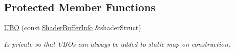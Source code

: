 \subsection*{Protected Member Functions}
\begin{DoxyCompactItemize}
\item 
\mbox{\label{classrev_1_1_u_b_o_a256028e880cb64f45ed9f4bac7da54cb}} 
\mbox{\hyperlink{classrev_1_1_u_b_o_a256028e880cb64f45ed9f4bac7da54cb}{U\+BO}} (const \mbox{\hyperlink{structrev_1_1_shader_buffer_info}{Shader\+Buffer\+Info}} \&shader\+Struct)
\begin{DoxyCompactList}\small\item\em Is private so that U\+B\+Os can always be added to static map on construction. \end{DoxyCompactList}\end{DoxyCompactItemize}
